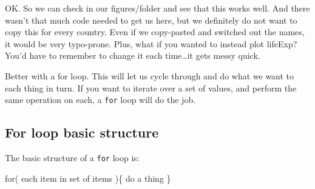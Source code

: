 \documentclass[]{book}
\newenvironment{Shaded}{\begin{snugshade}}{\end{snugshade}}
\newcommand{\KeywordTok}[1]{\textcolor[rgb]{0.13,0.29,0.53}{\textbf{{#1}}}}
\newcommand{\DataTypeTok}[1]{\textcolor[rgb]{0.13,0.29,0.53}{{#1}}}
\newcommand{\DecValTok}[1]{\textcolor[rgb]{0.00,0.00,0.81}{{#1}}}
\newcommand{\StringTok}[1]{\textcolor[rgb]{0.31,0.60,0.02}{{#1}}}
\newcommand{\NormalTok}[1]{{#1}}
\theoremstyle{definition}
\theoremstyle{definition}
\theoremstyle{definition}
\theoremstyle{remark}
\begin{document}
\begin{Shaded}
\end{Shaded}

OK. So we can check in our figures/folder and see that this works well.
And there wasn't that much code needed to get us here, but we definitely
do not want to copy this for every country. Even if we copy-pasted and
switched out the names, it would be very typo-prone. Plus, what if you
wanted to instead plot lifeExp? You'd have to remember to change it each
time\ldots{}it gets messy quick.

Better with a for loop. This will let us cycle through and do what we
want to each thing in turn. If you want to iterate over a set of values,
and perform the same operation on each, a \texttt{for} loop will do the
job.

\subsection{For loop basic structure}\label{for-loop-basic-structure}

The basic structure of a \texttt{for} loop is:

\begin{Shaded}
\begin{Highlighting}[]
\NormalTok{for( each item in set of items )\{}
  \NormalTok{do a thing}
\NormalTok{\}}
\end{Highlighting}
\end{Shaded}
\end{document}
